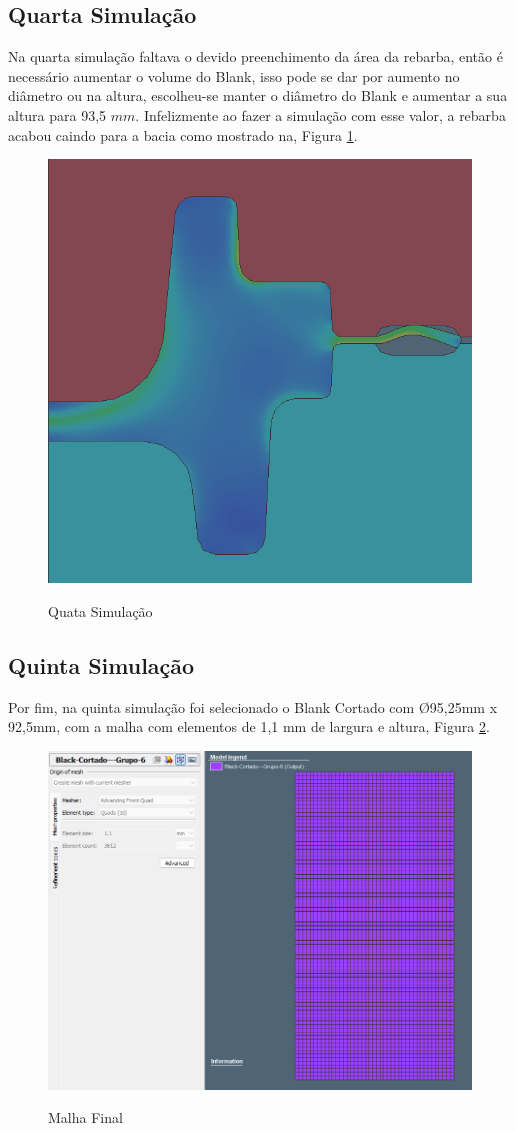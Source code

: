 \documentclass[deposito, acronym, symbols]{fei}
\begin{document}
\subsection{Quarta Simulação}

Na quarta simulação faltava o devido preenchimento da área da rebarba, então é necessário aumentar o volume do Blank, isso pode se dar por aumento no diâmetro ou na altura, escolheu-se manter o diâmetro do Blank e aumentar a sua altura para 93,5 $mm$. Infelizmente ao fazer a simulação com esse valor, a rebarba acabou caindo para a bacia como mostrado na, Figura \ref{fig:4simu}.

\begin{figure}[!htp]
    \centering
    \caption{Quata Simulação}
    \includegraphics[width=0.5\linewidth]{Imagens/Simufact - 4º Simulação com 93,5 mm.png}
    \label{fig:4simu}
\end{figure}

\newpage

\subsection{Quinta Simulação}

Por fim, na quinta simulação foi selecionado o Blank Cortado com Ø95,25mm x 92,5mm, com a malha com elementos de 1,1 mm de largura e altura, Figura \ref{fig:Malha Final}.

\begin{figure}[!htp]
    \centering
    \caption{Malha Final}
    \includegraphics[width=0.7\linewidth]{Imagens/Simufact - 5Malha.png}
    \label{fig:Malha Final}
\end{figure}
\end{document}
